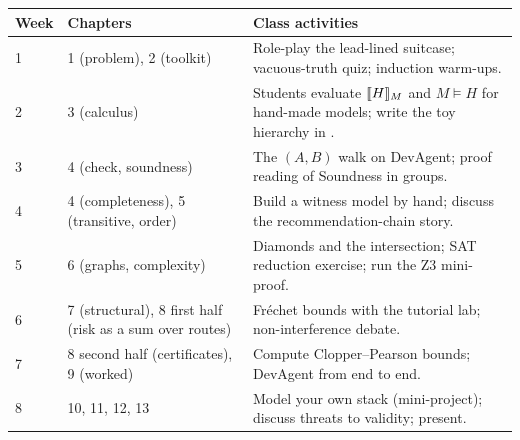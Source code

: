 \begin{center}
\renewcommand{\arraystretch}{1.25}
\small
\begin{tabularx}{\textwidth}{@{}p{1.3cm}p{4cm}X@{}}
\toprule
\textbf{Week} & \textbf{Chapters} & \textbf{Class activities}\\
\midrule
1 & 1 (problem), 2 (toolkit) & Role-play the lead-lined suitcase; vacuous-truth quiz; induction warm-ups.\\
2 & 3 (calculus) & Students evaluate $\llbracket H\rrbracket_{M}$ and $M\models H$ for hand-made models; write the toy hierarchy in \Hsl{}.\\
3 & 4 (check, soundness) & The $(A,B)$ walk on DevAgent; proof reading of Soundness in groups.\\
4 & 4 (completeness), 5 (transitive, order) & Build a witness model by hand; discuss the recommendation-chain story.\\
5 & 6 (graphs, complexity) & Diamonds and the intersection; SAT reduction exercise; run the Z3 mini-proof.\\
6 & 7 (structural), 8 first half (risk as a sum over routes) & Fr\'echet bounds with the tutorial lab; non-interference debate.\\
7 & 8 second half (certificates), 9 (worked) & Compute Clopper--Pearson bounds; DevAgent from end to end.\\
8 & 10, 11, 12, 13 & Model your own stack (mini-project); discuss threats to validity; present.\\
\bottomrule
\end{tabularx}
\end{center}
